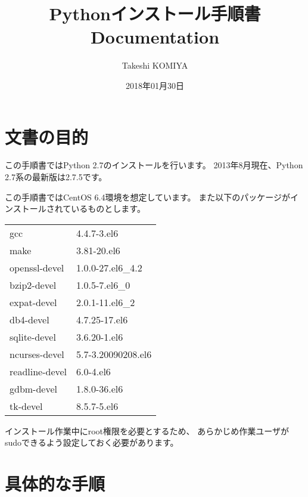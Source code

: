 \documentclass[letterpaper,10pt,dvipdfmx]{sphinxmanual}
\title{Pythonインストール手順書 Documentation}
\date{2018年01月30日}
\author{Takeshi KOMIYA}
\begin{document}
\maketitle
\sphinxtableofcontents
{}\label{\detokenize{index::doc}}



\chapter{文書の目的}
\label{\detokenize{purpose:id1}}\label{\detokenize{purpose:python-2-7}}\label{\detokenize{purpose::doc}}
この手順書ではPython 2.7のインストールを行います。
2013年8月現在、Python 2.7系の最新版は2.7.5です。

この手順書ではCentOS 6.4環境を想定しています。
また以下のパッケージがインストールされているものとします。


\begin{savenotes}\sphinxattablestart
\centering
{}
\label{\detokenize{purpose:id2}}
\sphinxaftercaption
\begin{tabulary}{\linewidth}[t]{|T|T|}
\hline
{}\relax &\relax \\
\hline
gcc
&
4.4.7-3.el6
\\
\hline
make
&
3.81-20.el6
\\
\hline
openssl-devel
&
1.0.0-27.el6\_4.2
\\
\hline
bzip2-devel
&
1.0.5-7.el6\_0
\\
\hline
expat-devel
&
2.0.1-11.el6\_2
\\
\hline
db4-devel
&
4.7.25-17.el6
\\
\hline
sqlite-devel
&
3.6.20-1.el6
\\
\hline
ncurses-devel
&
5.7-3.20090208.el6
\\
\hline
readline-devel
&
6.0-4.el6
\\
\hline
gdbm-devel
&
1.8.0-36.el6
\\
\hline
tk-devel
&
8.5.7-5.el6
\\
\hline
\end{tabulary}
\par
\sphinxattableend\end{savenotes}

インストール作業中にroot権限を必要とするため、
あらかじめ作業ユーザがsudoできるよう設定しておく必要があります。


\chapter{具体的な手順}
\label{\detokenize{procedure/index:id1}}\label{\detokenize{procedure/index::doc}}
\end{document}
